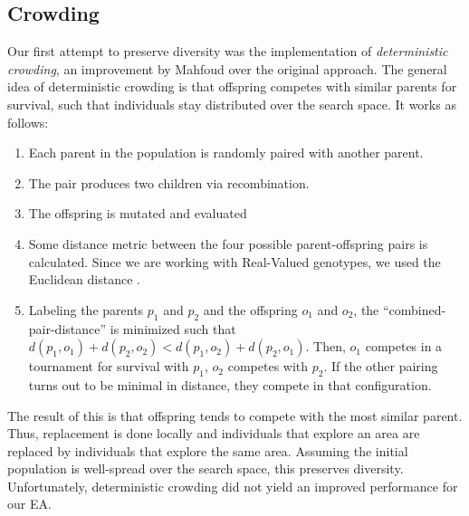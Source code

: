 \subsection{Crowding}\label{sec:crowding}
Our first attempt to preserve diversity was the implementation of \emph{deterministic crowding}, an
improvement by Mahfoud \cite{mahfoud1992crowding} over the original approach. The general idea of
deterministic crowding is that offspring competes with similar parents for survival, such that
individuals stay distributed over the search space. It works as follows:
\begin{enumerate}
    \item Each parent in the population is randomly paired with another parent.
    \item The pair produces two children via recombination.
    \item The offspring is mutated and evaluated
    \item Some distance metric between the four possible parent-offspring pairs is calculated.
    Since we are working with Real-Valued genotypes, we used the Euclidean distance
    \cite{wiki:eucl-distance}.
    \item Labeling the parents $p_1$ and $p_2$ and the offspring $o_1$ and $o_2$, the
    ``combined-pair-distance'' is minimized such that $d(p_1, o_1) + d(p_2, o_2) < d(p_1, o_2) +
    d(p_2, o_1)$. Then, $o_1$ competes in a tournament for survival with $p_1$, $o_2$ competes with
    $p_2$. If the other pairing turns out to be minimal in distance, they compete in that
    configuration.
\end{enumerate}
The result of this is that offspring tends to compete with the most similar parent. Thus,
replacement is done locally and individuals that explore an area are replaced by individuals
that explore the same area. Assuming the initial population is well-spread over the search
space, this preserves diversity. Unfortunately, deterministic crowding did not yield an improved
performance for our EA.

